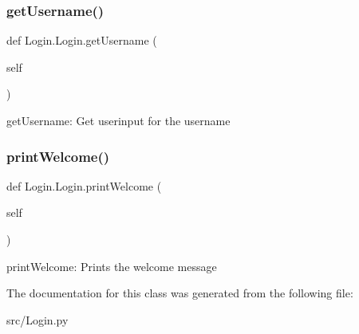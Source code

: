 \subsubsection{\texorpdfstring{get\+Username()}{getUsername()}}
{\footnotesize\ttfamily def Login.\+Login.\+get\+Username (\begin{DoxyParamCaption}\item[{}]{self }\end{DoxyParamCaption})}

\begin{DoxyVerb}getUsername: Get userinput for the username \end{DoxyVerb}
 \hypertarget{class_login_1_1_login_a77f5c43218a5b49e663f72e02324b8ef}{}\label{class_login_1_1_login_a77f5c43218a5b49e663f72e02324b8ef} 
\subsubsection{\texorpdfstring{print\+Welcome()}{printWelcome()}}
{\footnotesize\ttfamily def Login.\+Login.\+print\+Welcome (\begin{DoxyParamCaption}\item[{}]{self }\end{DoxyParamCaption})}

\begin{DoxyVerb}printWelcome: Prints the welcome message \end{DoxyVerb}
 

The documentation for this class was generated from the following file\+:\begin{DoxyCompactItemize}
\item 
src/Login.\+py\end{DoxyCompactItemize}
